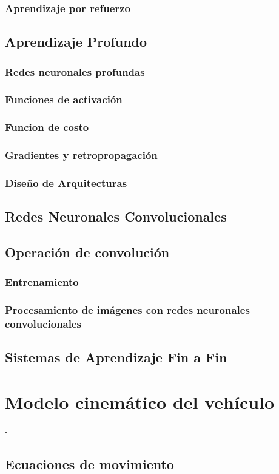         \subsubsection{Aprendizaje por refuerzo}
    
    

    \subsection{Aprendizaje Profundo}
        \subsubsection{Redes neuronales profundas}
        \subsubsection{Funciones de activación}
        \subsubsection{Funcion de costo}
        \subsubsection{Gradientes y retropropagación}
        \subsubsection{Diseño de Arquitecturas}

    \subsection{Redes Neuronales Convolucionales}
        \subsection{Operación de convolución}
        \subsubsection{Entrenamiento}
        \subsubsection{Procesamiento de imágenes con redes neuronales convolucionales}

    \subsection{Sistemas de Aprendizaje Fin a Fin}

\section{Modelo cinemático del vehículo}
-
    \subsection{Ecuaciones de movimiento}


